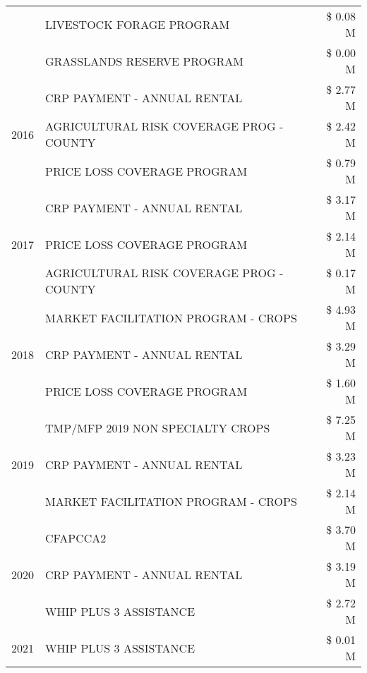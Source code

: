 \begin{tabular}{llr}
 & LIVESTOCK FORAGE PROGRAM & \$ 0.08 M \\
 & GRASSLANDS RESERVE PROGRAM & \$ 0.00 M \\
\cline{1-3}
\multirow[t]{3}{*}{2016} & CRP PAYMENT - ANNUAL RENTAL & \$ 2.77 M \\
 & AGRICULTURAL RISK COVERAGE PROG - COUNTY & \$ 2.42 M \\
 & PRICE LOSS COVERAGE PROGRAM & \$ 0.79 M \\
\cline{1-3}
\multirow[t]{3}{*}{2017} & CRP PAYMENT - ANNUAL RENTAL & \$ 3.17 M \\
 & PRICE LOSS COVERAGE PROGRAM & \$ 2.14 M \\
 & AGRICULTURAL RISK COVERAGE PROG - COUNTY & \$ 0.17 M \\
\cline{1-3}
\multirow[t]{3}{*}{2018} & MARKET FACILITATION PROGRAM - CROPS & \$ 4.93 M \\
 & CRP PAYMENT - ANNUAL RENTAL & \$ 3.29 M \\
 & PRICE LOSS COVERAGE PROGRAM & \$ 1.60 M \\
\cline{1-3}
\multirow[t]{3}{*}{2019} & TMP/MFP 2019 NON SPECIALTY CROPS & \$ 7.25 M \\
 & CRP PAYMENT - ANNUAL RENTAL & \$ 3.23 M \\
 & MARKET FACILITATION PROGRAM - CROPS & \$ 2.14 M \\
\cline{1-3}
\multirow[t]{3}{*}{2020} & CFAPCCA2 & \$ 3.70 M \\
 & CRP PAYMENT - ANNUAL RENTAL & \$ 3.19 M \\
 & WHIP PLUS 3 ASSISTANCE & \$ 2.72 M \\
\cline{1-3}
2021 & WHIP PLUS 3 ASSISTANCE & \$ 0.01 M \\
\cline{1-3}
\bottomrule
\end{tabular}
